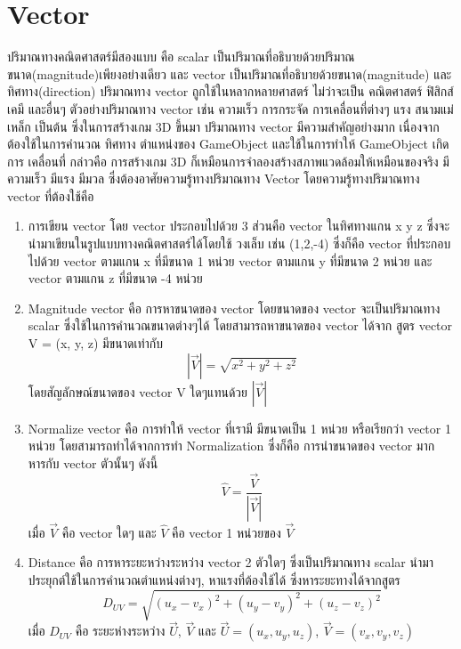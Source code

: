 \section{Vector}
\enskip \enskip \enskip \enskip \enskip ปริมาณทางคณิตศาสตร์มีสองแบบ คือ scalar เป็นปริมาณที่อธิบายด้วยปริมาณขนาด(magnitude)เพียงอย่างเดียว และ vector เป็นปริมาณที่อธิบายด้วยขนาด(magnitude) และทิศทาง(direction)
ปริมาณทาง vector ถูกใช้ในหลากหลายศาสตร์ ไม่ว่าจะเป็น คณิตศาสตร์ ฟิสิกส์ เคมี และอื่นๆ ตัวอย่างปริมาณทาง vector เช่น ความเร็ว การกระจัด
การเคลื่อนที่ต่างๆ แรง สนามแม่เหล็ก เป็นต้น ซึ่งในการสร้างเกม 3D ขึ้นมา ปริมาณทาง vector มีความสำคัญอย่างมาก เนื่องจากต้องใช้ในการคำนวณ ทิศทาง ตำแหน่งของ GameObject และใช้ในการทำให้ GameObject เกิดการ
เคลื่อนที่ กล่าวคือ การสร้างเกม 3D ก็เหมือนการจำลองสร้างสภาพแวดล้อมให้เหมือนของจริง มีความเร็ว มีแรง มีมวล ซึ่งต้องอาศัยความรู้ทางปริมาณทาง Vector
\enskip \enskip \enskip โดยความรู้ทางปริมาณทาง vector ที่ต้องใช้คือ
\begin{enumerate}
\item การเขียน vector โดย vector ประกอบไปด้วย 3 ส่วนคือ vector ในทิศทางแกน x y z ซึ่งจะนำมาเขียนในรูปแบบทางคณิตศาสตร์ได้โดยใช้ วงเล็บ เช่น (1,2,-4) ซึ่งก็คือ vector ที่ประกอบ
ไปด้วย vector ตามแกน x ที่มีขนาด 1 หน่วย vector ตามแกน y ที่มีขนาด 2 หน่วย และ vector ตามแกน z ที่มีขนาด -4 หน่วย
\item Magnitude vector คือ การหาขนาดของ vector โดยขนาดของ vector จะเป็นปริมาณทาง scalar ซึ่งใช้ในการคำนวณขนาดต่างๆได้ โดยสามารถหาขนาดของ vector ได้จาก
สูตร vector V = (x, y, z) มีขนาดเท่ากับ $$ |\vec{V}| = \sqrt{x^2 + y^2 + z^2} $$ โดยสัญลักษณ์ขนาดของ vector V ใดๆแทนด้วย $ |\vec{V}| $
\item Normalize vector คือ การทำให้ vector ที่เรามี มีขนาดเป็น 1 หน่วย หรือเรียกว่า vector 1 หน่วย โดยสามารถทำได้จากการทำ Normalization ซึ่งก็คือ การนำขนาดของ vector มาก
หารกับ vector ตัวนั้นๆ ดังนี้ $$ \hat{V} = \frac{\vec{V}}{|\vec{V}|} $$ 
เมื่อ $ \vec{V} $ คือ vector ใดๆ และ $ \hat{V} $ คือ vector 1 หน่วยของ $ \vec{V} $
\item Distance คือ การหาระยะหว่างระหว่าง vector 2 ตัวใดๆ ซึ่งเป็นปริมาณทาง scalar นำมาประยุกต์ใช้ในการคำนวณตำแหน่งต่างๆ, หาแรงที่ต้องใช้ได้ ซึ่งหาระยะทางได้จากสูตร
$$ D_{UV} = \sqrt{(u_x - v_x)^2 + (u_y - v_y)^2 + (u_z - v_z)^2}  $$
เมื่อ $ D_{UV} $ คือ ระยะห่างระหว่าง $ \vec{U} $, $ \vec{V} $ และ $ \vec{U} = (u_x, u_y, u_z)$,  $ \vec{V} = (v_x, v_y, v_z) $
\end{enumerate}

